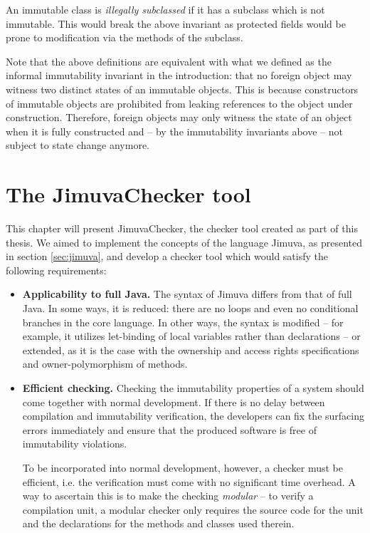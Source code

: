 \documentclass{pracamgr}
\theoremstyle{break}
\theoremstyle{break}
\theoremstyle{break}
\begin{document}
An immutable class is \emph{illegally subclassed} if it has a subclass
which is not immutable. This would break the above invariant as
protected fields would be prone to modification via the methods of the
subclass.

Note that the above definitions are equivalent with what we defined as
the informal immutability invariant in the introduction: that no
foreign object may witness two distinct states of an immutable
objects. This is because constructors of immutable objects are
prohibited from leaking references to the object under
construction. Therefore, foreign objects may only witness the state of
an object when it is fully constructed and -- by the immutability
invariants above -- not subject to state change anymore.


\chapter{The JimuvaChecker tool}
\label{chap:checker}

This chapter will present JimuvaChecker, the checker tool created as
part of this thesis. We aimed to implement the concepts of the
language Jimuva, as presented in section \ref{sec:jimuva}, and develop
a checker tool which would satisfy the following requirements:
\begin{itemize}
\item \textbf{Applicability to full Java.} The syntax of Jimuva
  differs from that of full Java. In some ways, it is reduced: there
  are no loops and even no conditional branches in the core
  language. In other ways, the syntax is modified -- for example, it
  utilizes let-binding of local variables rather than declarations --
  or extended, as it is the case with the ownership and access rights
  specifications and owner-polymorphism of methods.
\item \textbf{Efficient checking.} Checking the immutability
  properties of a system should come together with normal
  development. If there is no delay between compilation and
  immutability verification, the developers can fix the surfacing
  errors immediately and ensure that the produced software is free of
  immutability violations.

  To be incorporated into normal development, however, a checker must
  be efficient, i.e. the verification must come with no significant
  time overhead. A way to ascertain this is to make the checking
  \emph{modular} -- to verify a compilation unit, a modular checker
  only requires the source code for the unit and the declarations for
  the methods and classes used therein.
\end{itemize}
\end{document}
